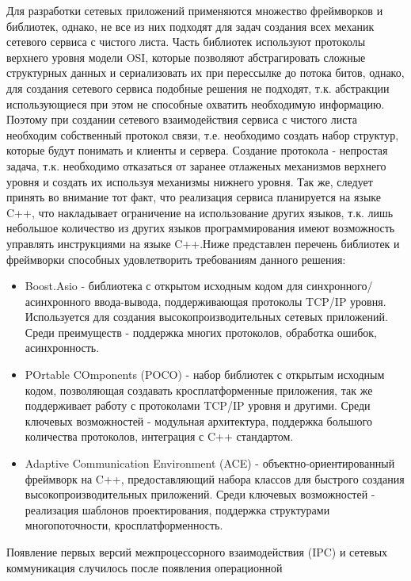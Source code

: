 \documentclass[a4paper, 14pt]{extreport}
\begin{document}
\par Для разработки сетевых приложений применяются множество фреймворков и библиотек, однако, не все из них подходят для задач создания 
всех механик сетевого сервиса с чистого листа. Часть библиотек используют протоколы верхнего уровня модели OSI, которые позволяют
абстрагировать сложные структурных
данных и сериализовать их при перессылке до потока битов, однако, для создания сетевого сервиса подобные решения не подходят, т.к.
абстракции использующиеся при этом не способные охватить необходимую информацию. Поэтому при создании сетевого взаимодействия
сервиса с чистого листа необходим собственный
протокол связи, т.е. необходимо создать набор структур, которые будут понимать и клиенты и сервера. Создание протокола - непростая задача, т.к. необходимо 
отказаться от заранее отлаженых механизмов верхнего уровня и создать их используя механизмы нижнего уровня. Так же, следует принять во 
внимание тот факт, что реализация сервиса планируется на языке C++, что накладывает ограничение на использование других языков, т.к.
лишь небольшое количество из других языков программирования имеют возможность управлять инструкциями на языке C++.Ниже представлен
перечень библиотек и фреймворки способных удовлетворить требованиям данного решения:
\begin{itemize}
        \item Boost.Asio - библиотека с открытом исходным кодом для синхронного/асинхронного ввода-вывода, поддерживающая протоколы
              TCP/IP уровня. Используется для создания высокопроизводительных сетевых приложений. Среди преимуществ - поддержка многих
              протоколов, обработка ошибок, асинхронность.
        \item POrtable COmponents (POCO)\cite{pocoDoc} - набор библиотек с открытым исходным кодом, позволяющая создавать кросплатформенные приложения,
              так же поддерживает работу с протоколами TCP/IP уровня и другими. Среди ключевых возможностей - модульная архитектура,
              поддержка большого количества протоколов, интеграция с C++ стандартом.
        \item Adaptive Communication Environment (ACE)\cite{aceBook} - объектно-ориентированный фреймворк на C++, предоставляющий набора классов для
              быстрого создания высокопроизводительных приложений. Среди ключевых возможностей - реализация шаблонов проектирования,
              поддержка структурами многопоточности, кросплатформенность. 
\end{itemize}
\par Появление первых версий межпроцессорного взаимодействия (IPC)\cite{ipcBook} и сетевых коммуникация случилось после появления операционной
\end{document}
